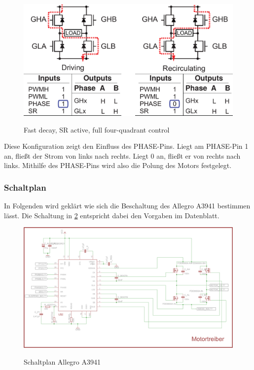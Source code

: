 \begin{figure}[H]
\centering
\includegraphics[width=.8\textwidth]{3941_5.png}\\
\caption{Fast decay, SR active, full four-quadrant control \cite{ds-A3941}}%
\label{fig:39415}
\end{figure}

Diese Konfiguration zeigt den Einfluss des PHA\-SE-Pins. Liegt am PHA\-SE-Pin 1 an,
fließt der Strom von links nach rechts. Liegt 0 an, fließt er von rechts nach links.
Mithilfe des PHASE-Pins wird also die Polung des Motors festgelegt.


\subsubsection{Schaltplan}

In Folgenden wird geklärt wie sich die Beschaltung des Allegro A3941 bestimmen lässt. Die Schaltung in \cref{fig:schalt:allegro} entspricht dabei den Vorgaben im Datenblatt.

\begin{figure}[H]
\centering
\includegraphics[width=\textwidth]{motortreiber.png}\\
\caption{Schaltplan Allegro A3941}%
\label{fig:schalt:allegro}
\end{figure}

